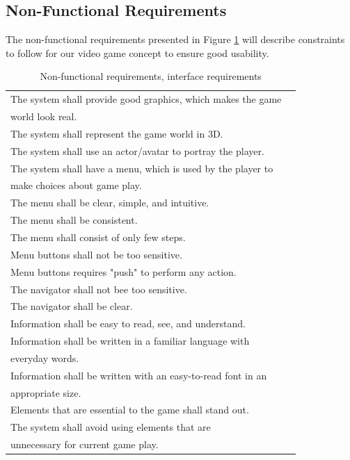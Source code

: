 \subsection{Non-Functional Requirements}
The non-functional requirements presented in Figure \ref{tab:nfunc} will describe constraints to follow for our video game concept to ensure good usability.

\begin{table} [H]
\label{tab:nfunc}
\centering
    \begin{tabular}{|l|l|}
 
       \hline
       The system shall provide good graphics, which makes the game \\ world look real. \\ \hline
	   The system shall represent the game world in 3D.\\ \hline
	   The system shall use an actor/avatar to portray the player.\\ \hline
	   The system shall have a menu, which is used by the player to \\ make choices about game play.\\ \hline
	   The menu shall be clear, simple, and intuitive.\\ \hline
	   The menu shall be consistent. \\ \hline
	   The menu shall consist of only few steps.\\ \hline
	   Menu buttons shall not be too sensitive.\\ \hline
	   Menu buttons requires "push" to perform any action.\\ \hline
	   The navigator shall not bee too sensitive. \\ \hline
	   The navigator shall be clear.\\ \hline
	   Information shall be easy to read, see, and understand.\\ \hline
	   Information shall be written in a familiar language with \\ everyday words.  \\ \hline
	   Information shall be written with an easy-to-read font in an \\ appropriate size. \\ \hline
	   Elements that are essential to the game shall stand out.\\ \hline
	   The system shall avoid using elements that are \\ unnecessary for current game play.\\ \hline
    \end{tabular}
    \caption[Non-functional requirements]{Non-functional requirements, interface requirements}
\end{table} 

